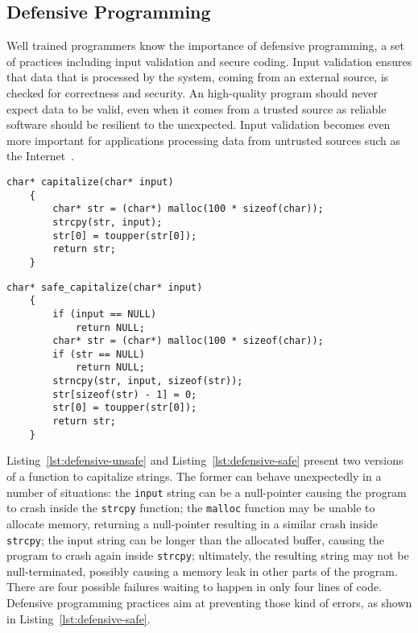 \subsection{Defensive Programming}
Well trained programmers know the importance of defensive programming, a set of
practices including input validation and secure coding. Input validation ensures
that data that is processed by the system, coming from an external source, is
checked for correctness and security. An high-quality program should never
expect data to be valid, even when it comes from a trusted source as reliable
software should be resilient to the unexpected. Input validation becomes even
more important for applications processing data from untrusted sources such as
the Internet~\cite{scholte2012have}.

\begin{lstlisting}[caption={Defensive programming: unsafe example},
                   label=lst:defensive-unsafe,float,floatplacement=h]
    char* capitalize(char* input)
    {
        char* str = (char*) malloc(100 * sizeof(char));
        strcpy(str, input);
        str[0] = toupper(str[0]);
        return str;
    }
\end{lstlisting}
\begin{lstlisting}[caption={Defensive programming: safe example},
                   label=lst:defensive-safe,float,floatplacement=h]
    char* safe_capitalize(char* input)
    {
        if (input == NULL)
            return NULL;
        char* str = (char*) malloc(100 * sizeof(char));
        if (str == NULL)
            return NULL;
        strncpy(str, input, sizeof(str));
        str[sizeof(str) - 1] = 0;
        str[0] = toupper(str[0]);
        return str;
    }
\end{lstlisting}

Listing~\ref{lst:defensive-unsafe} and Listing~\ref{lst:defensive-safe} present
two versions of a function to capitalize strings. The former can behave
unexpectedly in a number of situations: the \texttt{input} string can be a
null-pointer causing the program to crash inside the \texttt{strcpy} function;
the \texttt{malloc} function may be unable to allocate memory, returning a
null-pointer resulting in a similar crash inside \texttt{strcpy}; the input
string can be longer than the allocated buffer, causing the program to crash
again inside \texttt{strcpy}; ultimately, the resulting string may not be
null-terminated, possibly causing a memory leak in other parts of the program.
There are four possible failures waiting to happen in only four lines of code.
Defensive programming practices aim at preventing those kind of errors, as shown
in Listing~\ref{lst:defensive-safe}.

